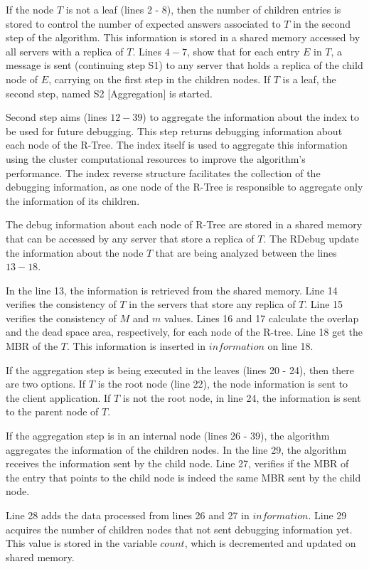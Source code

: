 If the node $T$ is not a leaf (lines 2 - 8), then the number of children entries is stored to control the number of expected answers associated to $T$ in the second step of the algorithm. 
This information is stored in a shared memory accessed by all servers with a replica of $T$. Lines $4-7$, show that for each entry $E$ in $T$, 
a message is sent (continuing step S1) to any server that holds a replica of the child node of $E$, carrying on the first step in the children nodes. 
If $T$ is a leaf, the second step, named S2 [Aggregation] is started.

Second step aims (lines $12-39$) to aggregate the information about the index to be used for future debugging.
This step returns debugging information about each node of the R-Tree.
The index itself is used to aggregate this information using the cluster computational resources to improve the algorithm's performance.
The index reverse structure facilitates the collection of the debugging information, 
as one node of the R-Tree is responsible to aggregate only the information of its children. 

The debug information about each node of R-Tree are stored in a shared memory that can be accessed by any server that store a replica of $T$.
The RDebug update the information about the node $T$ that are being analyzed between the lines $13-18$.

In the line 13, the information is retrieved from the shared memory. 
Line 14 verifies the consistency of $T$ in the servers that store any replica of $T$. Line 15 verifies the consistency of $M$ and $m$ values. 
Lines 16 and 17 calculate the overlap and the dead space area, respectively, for each node of the R-tree. 
Line 18 get the MBR of the $T$. This information is inserted in $information$ on line 18.

If the aggregation step is being executed in the leaves (lines 20 - 24), then there are two options.
If $T$ is the root node (line 22), the node information is sent to the client application. 
If $T$ is not the root node, in line 24, the information is sent to the parent node of $T$. 

If the aggregation step is in an internal node (lines 26 - 39), the algorithm aggregates the information of the children nodes. 
In the line 29, the algorithm receives the information sent by the child node. 
Line 27, verifies if the MBR of the entry that points to the child node is indeed the same MBR sent by the child node.
	
Line 28 adds the data processed from lines 26 and 27 in $information$. Line 29 acquires the number of children nodes that not sent debugging information yet. 
This value is stored in the variable $count$, which is decremented and updated on shared memory.
	
